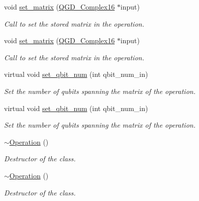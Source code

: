 \begin{DoxyCompactItemize}
void \hyperlink{class_operation_a026d3dcf0ad00af99c7a9097d3cf1c74}{set\+\_\+matrix} (\hyperlink{struct_q_g_d___complex16}{Q\+G\+D\+\_\+\+Complex16} $\ast$input)
\begin{DoxyCompactList}\small\item\em Call to set the stored matrix in the operation. \end{DoxyCompactList}\item 
void \hyperlink{class_operation_a026d3dcf0ad00af99c7a9097d3cf1c74}{set\+\_\+matrix} (\hyperlink{struct_q_g_d___complex16}{Q\+G\+D\+\_\+\+Complex16} $\ast$input)
\begin{DoxyCompactList}\small\item\em Call to set the stored matrix in the operation. \end{DoxyCompactList}\item 
virtual void \hyperlink{class_operation_ac107f65f10f3064e64372d4d17f2ff9b}{set\+\_\+qbit\+\_\+num} (int qbit\+\_\+num\+\_\+in)
\begin{DoxyCompactList}\small\item\em Set the number of qubits spanning the matrix of the operation. \end{DoxyCompactList}\item 
virtual void \hyperlink{class_operation_afdb60384bda6b1b1dfcc6f70ee074b57}{set\+\_\+qbit\+\_\+num} (int qbit\+\_\+num\+\_\+in)
\begin{DoxyCompactList}\small\item\em Set the number of qubits spanning the matrix of the operation. \end{DoxyCompactList}\item 
\hyperlink{class_operation_a14089623bd8a73e73375353c3d8a4b6e}{$\sim$\+Operation} ()
\begin{DoxyCompactList}\small\item\em Destructor of the class. \end{DoxyCompactList}\item 
\hyperlink{class_operation_a14089623bd8a73e73375353c3d8a4b6e}{$\sim$\+Operation} ()
\begin{DoxyCompactList}\small\item\em Destructor of the class. \end{DoxyCompactList}\end{DoxyCompactItemize}
